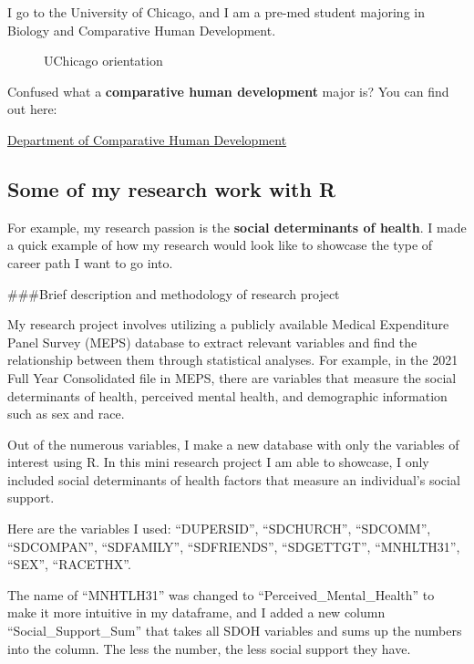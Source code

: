 \documentclass[
]{apa7}
\makeatletter
\newcommand*\pandocbounded[1]{%
  \sbox\pandoc@box{#1}%
  \Gscale@div\@tempa{\textheight}{\dimexpr\ht\pandoc@box+\dp\pandoc@box\relax}%
  \Gscale@div\@tempb{\linewidth}{\wd\pandoc@box}%
  \ifdim\@tempb\p@<\@tempa\p@\let\@tempa\@tempb\fi%
  \ifdim\@tempa\p@<\p@\scalebox{\@tempa}{\usebox\pandoc@box}%
  \else\usebox{\pandoc@box}%
  \fi%
}
\makeatother
\begin{document}
I go to the University of Chicago, and I am a pre-med student majoring
in Biology and Comparative Human Development.

\begin{figure}[H]

{\centering \pandocbounded{\texttt{[image: images/uchicago-walk.jpeg]}}

}

\caption{UChicago orientation}

\end{figure}%

Confused what a \textbf{comparative human development} major is? You can
find out here:

\href{https://humdev.uchicago.edu/}{Department of Comparative Human
Development}

\subsection{Some of my research work with
R}\label{some-of-my-research-work-with-r}

For example, my research passion is the \textbf{social determinants of
health}. I made a quick example of how my research would look like to
showcase the type of career path I want to go into.

\#\#\#Brief description and methodology of research project

My research project involves utilizing a publicly available Medical
Expenditure Panel Survey (MEPS) database to extract relevant variables
and find the relationship between them through statistical analyses. For
example, in the 2021 Full Year Consolidated file in MEPS, there are
variables that measure the social determinants of health, perceived
mental health, and demographic information such as sex and race.

Out of the numerous variables, I make a new database with only the
variables of interest using R. In this mini research project I am able
to showcase, I only included social determinants of health factors that
measure an individual's social support.

Here are the variables I used: ``DUPERSID'', ``SDCHURCH'', ``SDCOMM'',
``SDCOMPAN'', ``SDFAMILY'', ``SDFRIENDS'', ``SDGETTGT'', ``MNHLTH31'',
``SEX'', ``RACETHX''.

The name of ``MNHTLH31'' was changed to ``Perceived\_Mental\_Health'' to
make it more intuitive in my dataframe, and I added a new column
``Social\_Support\_Sum'' that takes all SDOH variables and sums up the
numbers into the column. The less the number, the less social support
they have.
\end{document}
